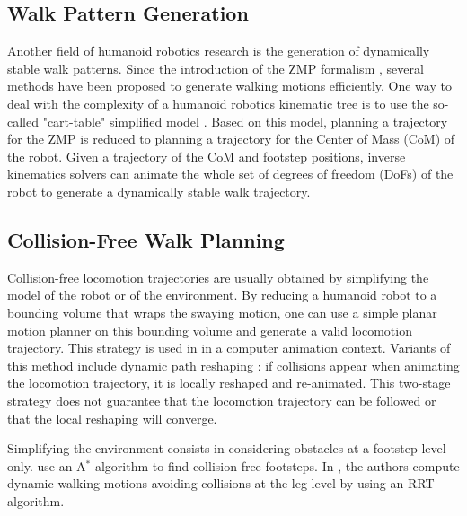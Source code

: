 \documentclass{article}
\begin{document}
\subsection{Walk Pattern Generation}

Another  field of  humanoid  robotics research  is  the generation  of
dynamically stable  walk patterns. Since  the introduction of  the ZMP
formalism  \cite{vukobratovic1969contribution},  several  methods  have  been  proposed  to
generate  walking  motions efficiently.   One  way  to  deal with  the
complexity  of a  humanoid  robotics  kinematic tree  is  to use  the
so-called "cart-table" simplified model \cite{kajita2003biped}. Based on this
model,  planning a trajectory  for the  ZMP is  reduced to  planning a
trajectory  for  the Center  of  Mass (CoM)  of  the  robot.  Given  a
trajectory  of  the CoM  and  footstep  positions, inverse  kinematics
solvers can animate  the whole set of degrees of freedom (DoFs) of the
robot to generate a dynamically stable walk trajectory.


\subsection{Collision-Free Walk Planning}

Collision-free  locomotion   trajectories  are  usually   obtained  by
simplifying the model of the  robot or of the environment. By reducing 
a  humanoid robot to a bounding volume that wraps the swaying motion,
one can  use a simple  planar motion planner  on this bounding  volume and
generate  a valid  locomotion  trajectory. This  strategy  is used  in
\cite{pettre20032} in a computer animation context. Variants of this method
include  dynamic path reshaping  \cite{yoshida-humanoids05}: if  collisions appear
when animating  the locomotion  trajectory, it is  locally reshaped
and re-animated.  This two-stage  strategy does not guarantee that the
locomotion trajectory can be followed or that the local reshaping will
converge.

Simplifying  the environment  consists in  considering obstacles  at a
footstep   level only.   \cite{kuffner2001footstep,chestnutt2005footstep,kuffner2005motion}
use   an  A$^{*}$   algorithm  to   find
collision-free   footsteps.    In   \cite{perrin2012fast},   the   authors   compute
dynamic walking motions avoiding collisions at the leg level
by using  an RRT algorithm. 
\end{document}
